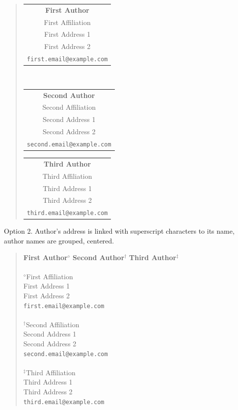 \documentclass[11pt,a4paper]{article}
\begin{document}
\begin{quote}\centering
  \begin{tabular}{c}
    \textbf{First Author} \\
    First Affiliation \\
    First Address 1 \\
    First Address 2 \\
    \texttt{first.email@example.com}
  \end{tabular}
  \
  \begin{tabular}{c}
    \textbf{Second Author} \\
    Second Affiliation \\
    Second Address 1 \\
    Second Address 2 \\
    \texttt{second.email@example.com}
  \end{tabular}

  \begin{tabular}{c}
    \textbf{Third Author} \\
    Third Affiliation \\
    Third Address 1 \\
    Third Address 2 \\
    \texttt{third.email@example.com}
  \end{tabular}
\end{quote}


Option 2. Author’s address is linked with superscript characters to its name,
author names are grouped, centered.

\begin{quote}\centering
    \textbf{First Author$^\diamond$} \quad \textbf{Second Author$^\dagger$} \quad
    \textbf{Third Author$^\ddagger$}
    \\ \ \\
    $^\diamond$First Affiliation \\
    First Address 1 \\
    First Address 2 \\
    \texttt{first.email@example.com}
     \\ \ \\
     $^\dagger$Second Affiliation \\
    Second Address 1 \\
    Second Address 2 \\
    \texttt{second.email@example.com}
     \\ \ \\
    $^\ddagger$Third Affiliation \\
    Third Address 1 \\
    Third Address 2 \\
    \texttt{third.email@example.com}
\end{quote}

\fi
\end{document}
